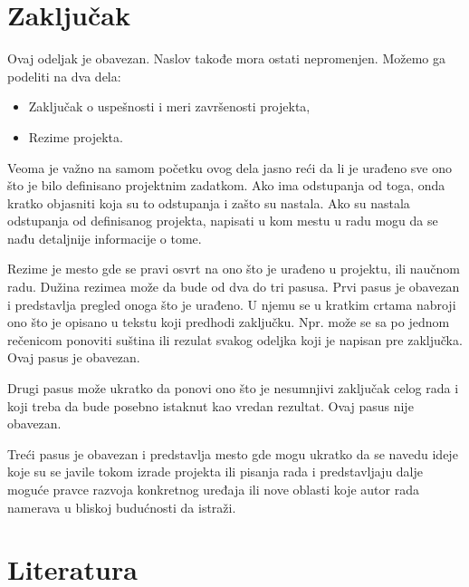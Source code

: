 \documentclass[a4paper, 12pt]{article}
\begin{document}
\section{Zaključak}

\vspace{10pt}


Ovaj odeljak je obavezan. Naslov takođe mora ostati nepromenjen. Možemo ga podeliti na dva dela:

\begin{itemize}
	\item Zaključak o uspešnosti i meri završenosti projekta,
	\item Rezime projekta.
\end{itemize}

\vspace{10pt}

Veoma je važno na samom početku ovog dela jasno reći da li je urađeno sve ono što je bilo definisano projektnim zadatkom. Ako ima odstupanja od toga, onda kratko objasniti koja su to odstupanja i zašto su nastala. Ako su nastala odstupanja od definisanog projekta, napisati u kom mestu u radu mogu da se nađu detaljnije informacije o tome.

\vspace{10pt}

Rezime je mesto gde se pravi osvrt na ono što je urađeno u projektu, ili naučnom radu. Dužina rezimea može da bude od dva do tri pasusa. Prvi pasus je obavezan i predstavlja pregled onoga što je urađeno. U njemu se u kratkim crtama nabroji ono što je opisano u tekstu koji predhodi zaključku. Npr. može se sa po jednom rečenicom ponoviti suština ili rezulat svakog odeljka koji je napisan pre zaključka. Ovaj pasus je obavezan.

\vspace{10pt}

Drugi pasus može ukratko da ponovi ono što je nesumnjivi zaključak celog rada i koji treba da bude posebno istaknut kao vredan rezultat. Ovaj pasus nije obavezan.

\vspace{10pt}

Treći pasus je obavezan i predstavlja mesto gde mogu ukratko da se navedu ideje koje su se javile tokom izrade projekta ili pisanja rada i predstavljaju dalje moguće pravce razvoja konkretnog uređaja ili nove oblasti koje autor rada namerava u bliskoj budućnosti da istraži.
\pagebreak

\section{Literatura}
\end{document}
